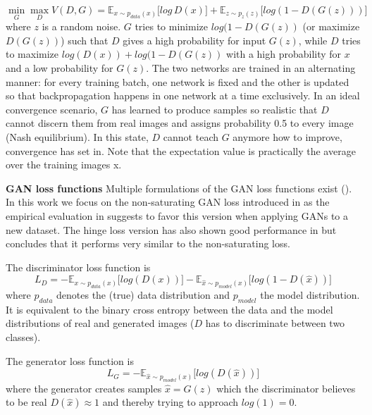 \documentclass[12pt,a4paper]{article}
\begin{document}
\begin{equation} \label{eq:1}
\min\limits_{G} \max\limits_{D} V(D,G) = \mathbb{E}_{x\sim p_{data} (x)}\big[log\, D(x)\big] + \mathbb{E}_{z\sim p_{z} (z)}\big[log(1 - D(G(z)))\big]
\end{equation}
where $z$ is a random noise. $G$ tries to minimize $log(1 - D(G(z))$ (or maximize $D(G(z))$) such that $D$ gives a high probability for input $G(z)$, while $D$ tries to maximize $log(D(x)) + log(1 - D(G(z))$ with a high probability for $x$ and a low probability for $G(z)$. The two networks are trained in an alternating manner: for every training batch, one network is fixed and the other is updated so that backpropagation happens in one network at a time exclusively. In an ideal convergence scenario, $G$ has learned to produce samples so realistic that $D$ cannot discern them from real images and assigns probability 0.5 to every image (Nash equilibrium). In this state, $D$ cannot teach $G$ anymore how to improve, convergence has set in. Note that the expectation value is practically the average over the training images x.

\par \textbf{GAN loss functions} 
Multiple formulations of the GAN loss functions exist (\cite{GANLandscape}). In this work we focus on the non-saturating GAN loss introduced in \cite{1406.2661} as the empirical evaluation in \cite{GANLandscape} suggests to favor this version when applying GANs to a new dataset. The hinge loss version has also shown good performance in \cite{SNGAN} but \cite{GANLandscape} concludes that it performs very similar to the non-saturating loss.

The discriminator loss function is
\begin{equation} \label{eq:d_loss}
    L_{D} = -\mathbb{E}_{x\sim p_{data} (x)}\big[log(D(x))\big] - \mathbb{E}_{\hat{x}\sim p_{model} (x)}\big[log(1 - D(\hat{x}))\big]
\end{equation}
where $p_{data}$ denotes the (true) data distribution and $p_{model}$ the model distribution. It is equivalent to the binary cross entropy between the data and the model distributions of real and generated images ($D$ has to discriminate between two classes).

The generator loss function is
\begin{equation} \label{eq:g_loss}
    L_{G} = -\mathbb{E}_{\hat{x}\sim p_{model} (x)}\big[log(D(\hat{x}))\big]
\end{equation}
where the generator creates samples $\hat{x} = G(z)$ which the discriminator believes to be real $D(\hat{x}) \approx 1$ and thereby trying to approach $log(1) = 0$.
\end{document}
